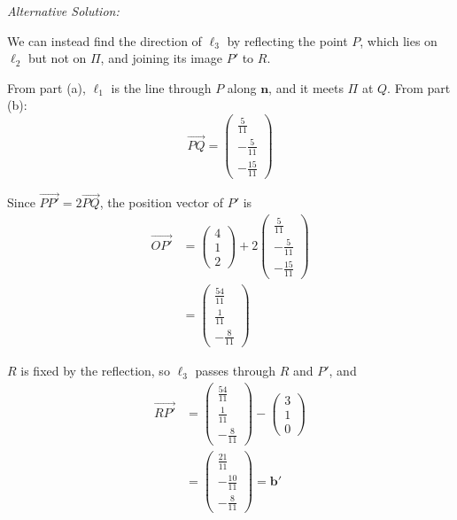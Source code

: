 \documentclass[leqno]{article}
\begin{document}
\begin{enumerate}[
  label=\textbf{\arabic*.},
  leftmargin=*,
  topsep=0pt,
  partopsep=0pt,
  parsep=0pt
]
\begin{djsSolution}
\begin{enumerate}[label=\textbf{(\alph*)}]
{\setlength{\parskip}{8pt}%
\textit{Alternative Solution:}

We can instead find the direction of \(\ell_3\) by reflecting the point \(P\), which lies on \(\ell_2\) but not on \(\Pi\), and joining its image \(P'\) to \(R\).

From part (a), \(\ell_1\) is the line through \(P\) along \(\mathbf n\), and it meets \(\Pi\) at \(Q\). From part (b):
\[
\overrightarrow{PQ}=\begin{pmatrix}\frac{5}{11}\\[2pt]-\frac{5}{11}\\[2pt]-\frac{15}{11}\end{pmatrix}
\]

Since \(\overrightarrow{PP'}=2\overrightarrow{PQ}\), the position vector of \(P'\) is
\begin{align*}
\overrightarrow{OP'}
&=
\begin{pmatrix}4\\1\\2\end{pmatrix}
+2\begin{pmatrix}\frac{5}{11}\\[2pt]-\frac{5}{11}\\[2pt]-\frac{15}{11}\end{pmatrix}\\
&=
\begin{pmatrix}\frac{54}{11}\\[2pt]\frac{1}{11}\\[2pt]-\frac{8}{11}\end{pmatrix}
\end{align*}

\(R\) is fixed by the reflection, so \(\ell_3\) passes through \(R\) and \(P'\), and
\begin{align*}
\overrightarrow{RP'}
&=
\begin{pmatrix}\frac{54}{11}\\[2pt]\frac{1}{11}\\[2pt]-\frac{8}{11}\end{pmatrix}
-
\begin{pmatrix}3\\1\\0\end{pmatrix}\\
&=
\begin{pmatrix}\frac{21}{11}\\[2pt]-\frac{10}{11}\\[2pt]-\frac{8}{11}\end{pmatrix}
=\mathbf b'
\end{align*}

}
\end{enumerate}
\end{djsSolution}
\end{enumerate}
\end{document}
